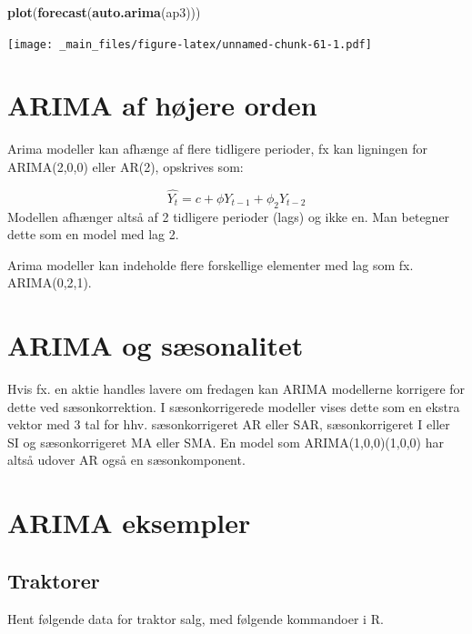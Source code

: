 \documentclass[]{book}
\newenvironment{Shaded}{\begin{snugshade}}{\end{snugshade}}
\newcommand{\KeywordTok}[1]{\textcolor[rgb]{0.13,0.29,0.53}{\textbf{#1}}}
\newcommand{\NormalTok}[1]{#1}
\begin{document}
\begin{Shaded}
\begin{Highlighting}[]
\KeywordTok{plot}\NormalTok{(}\KeywordTok{forecast}\NormalTok{(}\KeywordTok{auto.arima}\NormalTok{(ap3)))}
\end{Highlighting}
\end{Shaded}

\texttt{[image: \_main\_files/figure-latex/unnamed-chunk-61-1.pdf]}

\hypertarget{arima-af-hjere-orden}{%
\section{ARIMA af højere orden}\label{arima-af-hjere-orden}}

Arima modeller kan afhænge af flere tidligere perioder, fx kan ligningen for ARIMA(2,0,0) eller AR(2), opskrives som:

\[\hat{Y_t}=c + \phi Y_{t-1}+ \phi_2 Y_{t-2}\]
Modellen afhænger altså af 2 tidligere perioder (lags) og ikke en. Man betegner dette som en model med lag 2.

Arima modeller kan indeholde flere forskellige elementer med lag som fx. ARIMA(0,2,1).

\hypertarget{arima-og-ssonalitet}{%
\section{ARIMA og sæsonalitet}\label{arima-og-ssonalitet}}

Hvis fx. en aktie handles lavere om fredagen kan ARIMA modellerne korrigere for dette ved sæsonkorrektion. I sæsonkorrigerede modeller vises dette som en ekstra vektor med 3 tal for hhv. sæsonkorrigeret AR eller SAR, sæsonkorrigeret I eller SI og sæsonkorrigeret MA eller SMA. En model som ARIMA(1,0,0)(1,0,0) har altså udover AR også en sæsonkomponent.

\hypertarget{arima-eksempler}{%
\section{ARIMA eksempler}\label{arima-eksempler}}

\hypertarget{traktorer}{%
\subsection{Traktorer}\label{traktorer}}

Hent følgende data for traktor salg, med følgende kommandoer i R.
\end{document}
